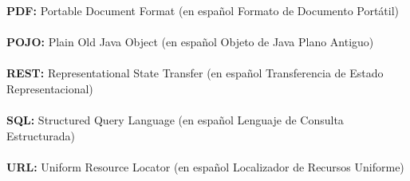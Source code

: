 \textbf{PDF:} Portable Document Format (en español Formato de Documento Portátil)\\ \\
\textbf{POJO:} Plain Old Java Object (en español Objeto de Java Plano Antiguo)\\ \\
\textbf{REST:} Representational State Transfer (en español Transferencia de Estado Representacional)\\ \\
\textbf{SQL:} Structured Query Language (en español Lenguaje de Consulta Estructurada)\\ \\
\textbf{URL:} Uniform Resource Locator (en español Localizador de Recursos Uniforme)